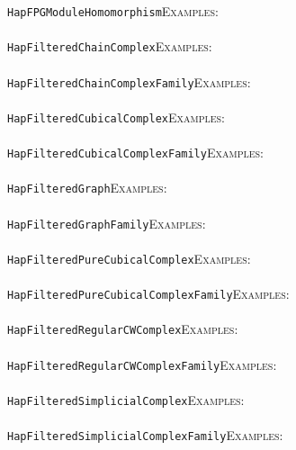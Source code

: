 \documentclass[a4paper,11pt]{report}
\begin{document}
{{ \texttt{HapFPGModuleHomomorphism}{\nobreakspace}{\nobreakspace}{\nobreakspace}{\nobreakspace}\textsc{Examples:} \\
 \\
 \texttt{HapFilteredChainComplex}{\nobreakspace}{\nobreakspace}{\nobreakspace}{\nobreakspace}\textsc{Examples:} \\
 \\
 \texttt{HapFilteredChainComplexFamily}{\nobreakspace}{\nobreakspace}{\nobreakspace}{\nobreakspace}\textsc{Examples:} \\
 \\
 \texttt{HapFilteredCubicalComplex}{\nobreakspace}{\nobreakspace}{\nobreakspace}{\nobreakspace}\textsc{Examples:} \\
 \\
 \texttt{HapFilteredCubicalComplexFamily}{\nobreakspace}{\nobreakspace}{\nobreakspace}{\nobreakspace}\textsc{Examples:} \\
 \\
 \texttt{HapFilteredGraph}{\nobreakspace}{\nobreakspace}{\nobreakspace}{\nobreakspace}\textsc{Examples:} \\
 \\
 \texttt{HapFilteredGraphFamily}{\nobreakspace}{\nobreakspace}{\nobreakspace}{\nobreakspace}\textsc{Examples:} \\
 \\
 \texttt{HapFilteredPureCubicalComplex}{\nobreakspace}{\nobreakspace}{\nobreakspace}{\nobreakspace}\textsc{Examples:} \\
 \\
 \texttt{HapFilteredPureCubicalComplexFamily}{\nobreakspace}{\nobreakspace}{\nobreakspace}{\nobreakspace}\textsc{Examples:} \\
 \\
 \texttt{HapFilteredRegularCWComplex}{\nobreakspace}{\nobreakspace}{\nobreakspace}{\nobreakspace}\textsc{Examples:} \\
 \\
 \texttt{HapFilteredRegularCWComplexFamily}{\nobreakspace}{\nobreakspace}{\nobreakspace}{\nobreakspace}\textsc{Examples:} \\
 \\
 \texttt{HapFilteredSimplicialComplex}{\nobreakspace}{\nobreakspace}{\nobreakspace}{\nobreakspace}\textsc{Examples:} \\
 \\
 \texttt{HapFilteredSimplicialComplexFamily}{\nobreakspace}{\nobreakspace}{\nobreakspace}{\nobreakspace}\textsc{Examples:} \\
}}
\end{document}
